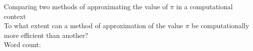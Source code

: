 \documentclass[12pt,a4paper]{article}
\begin{document}
\doublespacing %


\begin{titlepage}
    \begin{center}
    \vspace*{4cm}
        Comparing two methods of approximating the value of $\pi$ in a
        computational context\\
    \vspace{1cm}
    To what extent can a method of approximation of the value $\pi$ be computationally more efficient than another? \\
    \vspace{4cm}
    Word count: 
    \vfill
    \vspace{0.1cm}
    \end{center}
    \end{titlepage}



\begin{center}
\tableofcontents
\vspace{1in}

\end{center}




\newpage












\printbibliography[heading=bibintoc, title=Works Cited]
\end{document}
